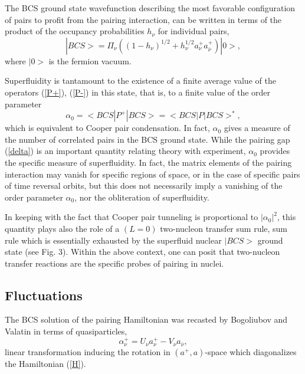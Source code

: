 \documentclass[a4paper,14pt]{book}
\begin{document}
The BCS ground state wavefunction describing the most favorable configuration  of pairs to profit from the pairing interaction, can be 
written in terms  of the product of the occupancy probabilities $h_{\nu}$ for individual pairs,
\begin{equation}
|BCS> = \Pi_{\nu} ( (1 - h_{\nu})^{1/2} + h_{\nu}^{1/2} a^+_{\nu}a^+_{\bar \nu}) |0>,
\end{equation}
where $|0>$ is the fermion vacuum.

Superfluidity is tantamount to the existence of a finite average value of the operators  (\ref{P+}), (\ref{P-})
in this state, that is, to a finite value of the order parameter
\begin{equation}
\alpha_0 = <BCS|P^+|BCS> = <BCS|P|BCS>^*,
\end{equation}
 which is equivalent to Cooper pair condensation. In fact, $\alpha_0$ gives  a measure of the 
number of correlated pairs in the BCS ground state.
While the pairing gap (\ref{delta}) is an important quantity relating theory with experiment, $\alpha_0$ 
provides the specific measure  of superfluidity. In fact, the matrix elements of the pairing interaction
may vanish for specific regions of space,  or in the case of specific pairs of time reversal orbits, but this does not necessarily
imply a vanishing of the order parameter $\alpha_0$, nor the obliteration of superfluidity.

In keeping with the fact that Cooper pair tunneling is proportional to $|\alpha_0|^2$, this quantity plays also the
role of a $(L=0)$ two-nucleon
transfer sum rule, sum rule which is essentially exhausted by the superfluid nuclear $|BCS>$ ground state (see Fig. 3). Within the above context, one can posit that two-nucleon transfer reactions are the specific probes of pairing in nuclei.   

\subsection{Fluctuations}
The BCS solution of the pairing Hamiltonian was recasted by Bogoliubov \cite{Bogoliubov:58} and Valatin \cite{Valatin:58} in terms of quasiparticles, 
\begin{equation}
\alpha^+_{\nu} = U_{\nu} a^+_{\nu} - V_{\nu} a_{\bar \nu},
\end{equation}
linear transformation inducing the rotation in  $(a^+,a)$-space which diagonalizes  the Hamiltonian (\ref{H}).
\end{document}
